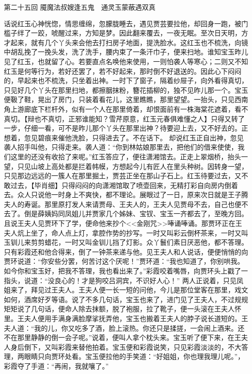 \documentclass[12pt,oneside]{book}
\begin{document}
 
第二十五回  魇魔法叔嫂逢五鬼　通灵玉蒙蔽遇双真


话说红玉心神恍惚，情思缠绵，忽朦胧睡去，遇见贾芸要拉他，却回身一跑，被门槛子绊了一跤，唬醒过来，方知是梦。因此翻来覆去，一夜无眠。至次日天明，方才起来，就有几个丫头来会他去打扫房子地面，提洗脸水。这红玉也不梳洗，向镜中胡乱挽了一挽头发，洗了洗手，腰内束了一条汗巾子，便来扫地。谁知宝玉昨儿见了红玉，也就留了心。若要直点名唤他来使用，一则怕袭人等寒心；二则又不知红玉是何等行为，若好还罢了，若不好起来，那时倒不好退送的。因此心下闷闷的，早起来也不梳洗，只坐着出神。一时下了窗子，隔着纱屉子，向外看得真切，只见好几个丫头在那里扫地，都擦胭抹粉，簪花插柳的，独不见昨儿那一个。宝玉便靸了鞋，晃出了房门，只装着看花儿，这里瞧瞧，那里望望。一抬头，只见西南角上游廊底下栏杆外，似有一个人在那里倚着，却恨面前有一株海棠花遮着，看不真切。【辩也不真切，正邪谁能知？雪芹原意，红玉元春俱难懂之人】只得又转了一步，仔细一看，可不是昨儿那个丫头在那里出神？待要迎上去，又不好去的。正想着，忽见碧痕来催他洗脸，只得进去了。不在话下。
却说红玉正自出神，忽见袭人招手叫他，只得走来。袭人道：“你到林姑娘那里去，把他们的借来使使，我们这里的还没有收拾了来呢。”红玉答应了，便往潇湘馆去。正走上翠烟桥，抬头一望，只见山坡上高处都是拦着帏幙，方想起今儿有匠人在里头种树。因转身一望，只见那边远远的一簇人在那里掘土，贾芸正坐在那山子石上。红玉待要过去，又不敢过去，【毕肖细】只得闷闷的向潇湘馆取了喷壶回来，无精打彩自向房内倒着去。众人只说他一时身上不爽快，都不理论。展眼过了一日，原来次日就是王子腾夫人的寿诞。那里原打发人来请贾母、王夫人的，王夫人见贾母不去，自己也便不去了。倒是薛姨妈同凤姐儿并贾家几个姊妹、宝钗、宝玉一齐都去了，至晚方回。
且说王夫人见贾环下了学，便命他来抄个<<金刚咒>>唪诵唪诵。那贾环正在王夫人炕上坐了，命人点上灯，拿腔作势的抄写。一时又叫彩云倒杯茶来，一时又叫玉钏儿来剪剪蜡花，一时又叫金钏儿挡了灯影。众丫鬟们素日厌恶他，都不答理。只有彩霞还和他合得来，倒了一钟茶来递与他。见王夫人和人说话，便便悄悄的向贾环说道：“你安些分罢，何苦讨这个厌呢！”贾环道：“我也知道了，你别哄我。如今你和宝玉好，把我不答理，我也看出来了。”彩霞咬着嘴唇，向贾环头上戳了一指头，说道：“没良心的！才是狗咬吕洞宾，不识好人心！”
两人正说着，只见凤姐来了，拜见过王夫人。王夫人便一长一短的问他，今儿是那位堂客在那里，戏文如何，酒席好歹等语。说了不多几句话，宝玉也来了，进门见了王夫人，不过规规矩矩说了几句话，便命人除去抹额，脱了袍服，拉了靴子，便一头滚在王夫人怀里。王夫人便用手满身满脸摩挲抚弄他，宝玉也搬着王夫人的脖子说长道短的。王夫人道：“我的儿，你又吃多了酒，脸上滚热。你还只是揉搓，一会闹上酒来。还不在那里静静的倒一会子呢。”说着，便叫人拿个枕头来。宝玉听了便下来，在王夫人身后倒下，又叫彩霞来替他拍着。宝玉便和彩霞说笑，只见彩霞淡淡的，不大答理，两眼睛只向贾环处看。宝玉便拉他的手笑道：“好姐姐，你也理我理儿呢。”，彩霞夺了手道：“再闹，我就嚷了。”
\end{document}
